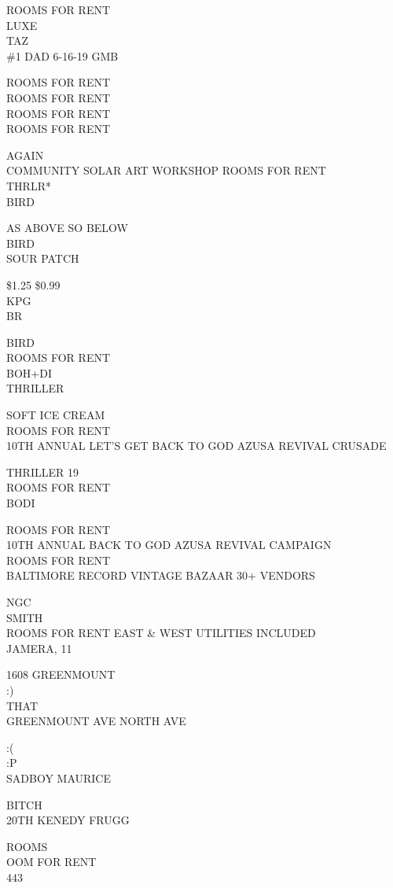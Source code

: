 \documentclass[10pt,letterpaper]{article}
\begin{document}
ROOMS FOR RENT\\
LUXE\\
TAZ\\
\#1 DAD 6{-}16{-}19 GMB

ROOMS FOR RENT\\
ROOMS FOR RENT\\
ROOMS FOR RENT\\
ROOMS FOR RENT

AGAIN\\
COMMUNITY SOLAR ART WORKSHOP ROOMS FOR RENT\\
THRLR*\\
BIRD

AS ABOVE SO BELOW\\
BIRD\\
SOUR PATCH

\$1.25 \$0.99\\
KPG\\
BR

BIRD\\
ROOMS FOR RENT\\
BOH+DI\\
THRILLER

SOFT ICE CREAM\\
ROOMS FOR RENT\\
10TH ANNUAL LET'S GET BACK TO GOD AZUSA REVIVAL CRUSADE

THRILLER 19\\
ROOMS FOR RENT\\
BODI

ROOMS FOR RENT\\
10TH ANNUAL BACK TO GOD AZUSA REVIVAL CAMPAIGN\\
ROOMS FOR RENT\\
BALTIMORE RECORD VINTAGE BAZAAR 30+ VENDORS

NGC\\
SMITH\\
ROOMS FOR RENT EAST \& WEST UTILITIES INCLUDED\\
JAMERA, 11

1608 GREENMOUNT\\
:)\\
THAT\\
GREENMOUNT AVE NORTH AVE

:(\\
:P\\
SADBOY MAURICE

BITCH\\
20TH KENEDY FRUGG

ROOMS\\
OOM FOR RENT\\
443
\end{document}
